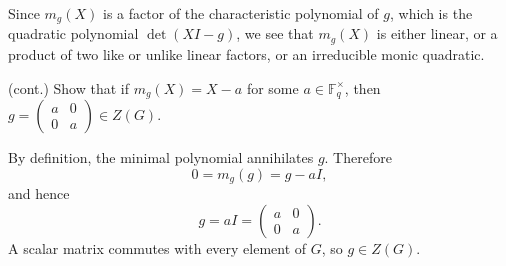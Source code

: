 \documentclass[../Odyssey_Project.tex]{subfiles}
\begin{document}
\noindent Since $m_g(X)$ is a factor of the characteristic polynomial of $g$, which is the quadratic polynomial $\det(XI - g)$, we see that $m_g(X)$ is either linear, or a product of two like or unlike linear factors, or an irreducible monic quadratic.

\begin{exercise}
\label{ex:16.9}
(cont.) Show that if $m_g(X) = X - a$ for some $a \in \mathbb{F}_q^\times$, then $g = \begin{pmatrix} a & 0 \\ 0 & a \end{pmatrix} \in Z(G)$.
\end{exercise}
\begin{solution}
    By definition, the minimal polynomial annihilates $g$. Therefore
    \[
        0=m_g(g)=g-aI,
    \]
    and hence
    \[
        g=aI=
        \begin{pmatrix}
            a&0\\
            0&a
        \end{pmatrix}.
    \]
    A scalar matrix commutes with every element of $G$, so $g\in Z(G)$.
\end{solution}
\end{document}
